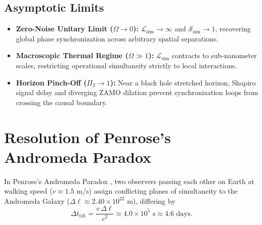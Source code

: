 \documentclass[11pt,a4paper]{article}
\begin{document}
\subsection*{Asymptotic Limits}
\begin{itemize}
    \item \textbf{Zero-Noise Unitary Limit ($\Omega \to 0$):} $\mathcal{L}_{\mathrm{sim}} \to \infty$ and $\mathcal{S}_{\mathrm{sim}} \to 1$, recovering global phase synchronization across arbitrary spatial separations.
    \item \textbf{Macroscopic Thermal Regime ($\Omega \gg 1$):} $\mathcal{L}_{\mathrm{sim}}$ contracts to sub-nanometer scales, restricting operational simultaneity strictly to local interactions.
    \item \textbf{Horizon Pinch-Off ($\Pi_2 \to 1$):} Near a black hole stretched horizon, Shapiro signal delay and diverging ZAMO dilation prevent synchronization loops from crossing the causal boundary.
\end{itemize}

\section{Resolution of Penrose's Andromeda Paradox}
In Penrose's Andromeda Paradox \cite{penrose1989}, two observers passing each other on Earth at walking speed ($v \approx 1.5\text{ m/s}$) assign conflicting planes of simultaneity to the Andromeda Galaxy ($\Delta \ell \approx 2.40 \times 10^{22}\text{ m}$), differing by
\begin{equation}
    \Delta t_{\mathrm{tilt}} = \frac{v \, \Delta \ell}{c^2} \approx 4.0 \times 10^5\text{ s} \approx 4.6\text{ days}.
\end{equation}
\end{document}
